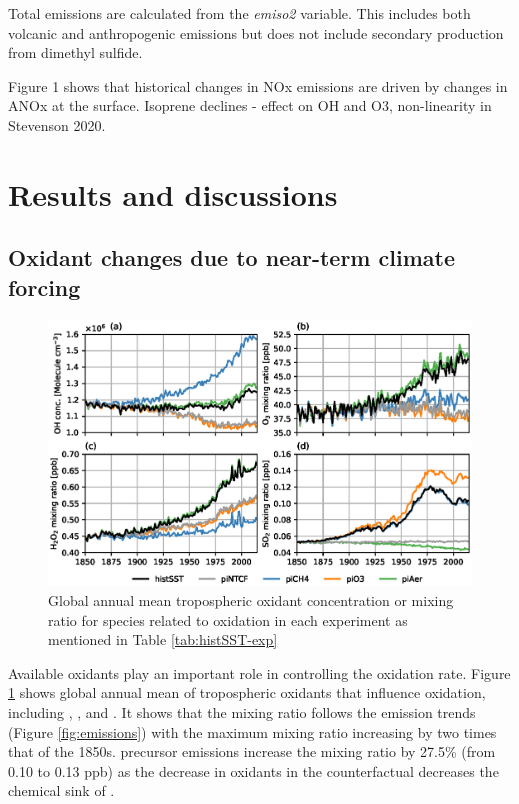 Total  emissions are calculated from the \textit{emiso2} variable. This includes both volcanic and anthropogenic  emissions but does not include secondary production from dimethyl sulfide. 

Figure 1 shows that historical changes in NOx emissions are driven by changes in ANOx at the surface.  Isoprene declines - effect on OH and O3, non-linearity in Stevenson 2020.

\section{Results and discussions}
\label{sec:results}

\subsection{Oxidant changes due to near-term climate forcing}
\begin{figure}
    \centering
    \includegraphics[width=\linewidth]{Chapter3/Figs/f02_oxidant-changes.eps}
    \caption{Global annual mean tropospheric oxidant concentration or mixing ratio for species related to  oxidation in each experiment as mentioned in Table \ref{tab:histSST-exp}}
    \label{fig:f02}
\end{figure}

Available oxidants play an important role in controlling the oxidation rate. Figure \ref{fig:f02} shows global annual mean of tropospheric oxidants that influence  oxidation, including , ,  and . It shows that the  mixing ratio follows the  emission trends (Figure \ref{fig:emissions}) with the maximum mixing ratio increasing by two times that of the 1850s.   precursor emissions increase the  mixing ratio by 27.5\% (from 0.10 to 0.13 ppb) as the decrease in oxidants in the counterfactual decreases the chemical sink of . 


